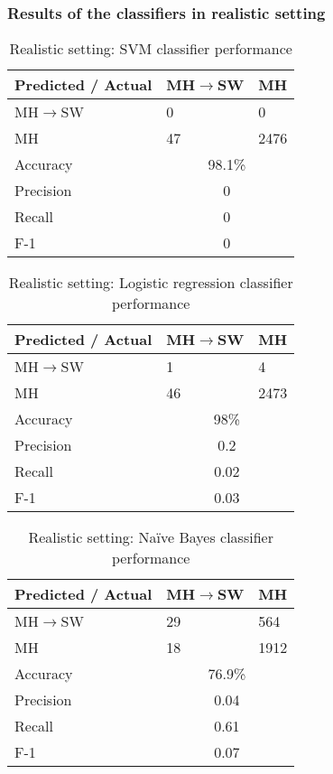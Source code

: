 \subsubsection*{Results of the classifiers in realistic setting}
\begin{table}[h!]
\small
\noindent\begin{tabularx}{\textwidth}{X|X|X}
\toprule
Predicted / Actual &  MH$\rightarrow$SW & MH\\ 
\midrule
 MH$\rightarrow$SW & 0 & 0  \\
MH & 47 &  2476 \\ 
\midrule
Accuracy & \multicolumn{2}{c}{98.1\%}\\
Precision &\multicolumn{2}{c}{0}  \\
Recall     &\multicolumn{2}{c}{0} \\
F-1        &    \multicolumn{2}{c}{0}  \\
\bottomrule
\end{tabularx}
\caption{Realistic setting: SVM classifier performance}
\label{tab:svm_performance}
\end{table}
\begin{table}[h!]
\small
\noindent\begin{tabularx}{\textwidth}{X|X|X}
\toprule
Predicted / Actual &  MH$\rightarrow$SW & MH\\ 
\midrule
 MH$\rightarrow$SW & 1  & 4  \\
MH &  46 & 2473\\ 
\midrule
Accuracy & \multicolumn{2}{c}{98\%}\\
Precision &\multicolumn{2}{c}{0.2}  \\
Recall     &\multicolumn{2}{c}{0.02} \\
F-1        &    \multicolumn{2}{c}{0.03}  \\
\bottomrule
\end{tabularx}
\caption{Realistic setting: Logistic regression classifier performance}
\label{tab:logistic_performance}
\end{table}
\begin{table}[h!]
\small
\noindent\begin{tabularx}{\textwidth}{X|X|X}
\toprule
Predicted / Actual &  MH$\rightarrow$SW & MH \\ 
\midrule
 MH$\rightarrow$SW & 29 & 564\\
MH & 18 & 1912\\ 
\midrule
Accuracy & \multicolumn{2}{c}{76.9\%}\\
Precision &\multicolumn{2}{c}{0.04}  \\
Recall     &\multicolumn{2}{c}{0.61} \\
F-1        &    \multicolumn{2}{c}{0.07}  \\
\bottomrule
\end{tabularx}
\caption{Realistic setting: Na\"ive Bayes classifier performance}
\label{tab:nb_performance}
\end{table}
